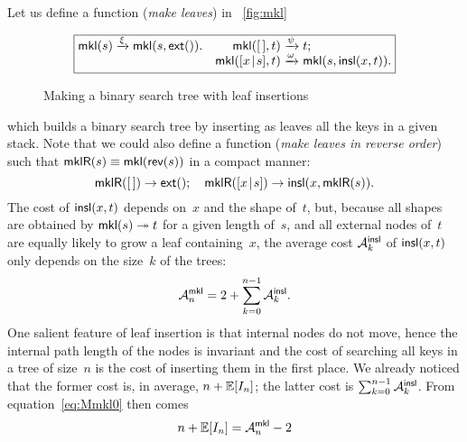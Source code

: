 Let us define a function 
 (\emph{make leaves}) in \fig~\vref{fig:mkl}
\begin{figure}
\begin{equation*}
\boxed{
\begin{array}{@{}r@{\;}l@{\;}lr@{\;}l@{\;}l@{}}
  \fun{mkl}(s) & \xrightarrow{\smash{\xi}} & \fun{mkl}(s,\fun{ext}()).
& \fun{mkl}(\el,t) & \xrightarrow{\smash{\psi}} & t;\\
& & & \fun{mkl}(\cons{x}{s},t) & \xrightarrow{\smash{\omega}} & \fun{mkl}(s,\fun{insl}(x,t)).
\end{array}}
\end{equation*}
\caption{Making a binary search tree with leaf insertions
\label{fig:mkl}}
\end{figure}
which builds a binary search tree by inserting as leaves all the keys
in a given stack. Note that we could also define a function
 (\emph{make leaves in reverse order}) such that
\(\fun{mklR}(s) \equiv \fun{mkl}(\fun{rev}(s))\) in a compact manner:
\begin{equation}
  \fun{mklR}(\el) \rightarrow \fun{ext}();
  \quad
  \fun{mklR}(\cons{x}{s}) \rightarrow \fun{insl}(x,\fun{mklR}(s)).
\label{eq:mklR}
\end{equation}
The cost of \(\fun{insl}(x,t)\) depends on~\(x\) and the shape
of~\(t\), but, because all shapes are obtained by \(\fun{mkl}(s)
\twoheadrightarrow t\) for a given length of~\(s\), and all external
nodes of~\(t\) are equally likely to grow a leaf containing~\(x\), the
average cost \(\M{\fun{insl}}{k}\) of
\(\fun{insl}(x,t)\) only depends on the size~\(k\) of the trees:
\begin{equation}
\abovedisplayskip=2pt
\abovedisplayshortskip=2pt
\belowdisplayskip=4pt
\M{\fun{mkl}}{n} = 2 + \sum_{k=0}^{n-1}\M{\fun{insl}}{k}.
\label{eq:Mmkl0}
\end{equation}
One salient feature of leaf insertion is that internal nodes do not
move, hence the internal path length of the nodes is invariant and the cost of
searching all keys in a tree of size~\(n\) is the cost of inserting
them in the first place. We already noticed that the former cost is,
in average, \(n + \Expected{I_n}\); the latter cost is
\(\sum_{k=0}^{n-1}\M{\fun{insl}}{k}\). From equation~\eqref{eq:Mmkl0}
then comes
\begin{equation}
n + \Expected{I_n} = \M{\fun{mkl}}{n} - 2
\label{eq:n_EIn}
\end{equation}
